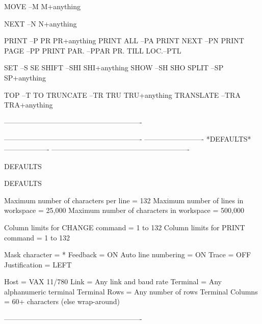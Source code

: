    MOVE         --M            M+anything
 
   NEXT         --N            N+anything
 
   PRINT        --P            PR           PR+anything
   PRINT ALL    --PA
   PRINT NEXT   --PN
   PRINT PAGE   --PP
   PRINT PAR.   --PPAR
   PR. TILL LOC.--PTL
 
   SET          --S            SE
   SHIFT        --SHI          SHI+anything
   SHOW         --SH           SHO
   SPLIT        --SP           SP+anything
 
   TOP          --T            TO
   TRUNCATE     --TR           TRU          TRU+anything
   TRANSLATE    --TRA          TRA+anything
 
----------------------------------------------------------
 
 
 
 
 
 
 
 
 
 
 
 
 
 
 
 
 
 
 
 
 
 
 
 
 
----------------------------------------------------------
-------------------------  *DEFAULTS*  -------------------
----------------------------------------------------------
 
DEFAULTS
 
DEFAULTS
 
   Maximum number of characters   per line   =     132
   Maximum number of lines      in workspace =  25,000
   Maximum number of characters in workspace = 500,000
 
   Column limits for CHANGE command          = 1 to 132
   Column limits for PRINT  command          = 1 to 132
 
   Mask character      = *
   Feedback            = ON
   Auto line numbering = ON
   Trace               = OFF
   Justification       = LEFT
 
   Host                = VAX 11/780
   Link                = Any link and baud rate
   Terminal            = Any alphanumeric terminal
   Terminal Rows       = Any number of rows
   Terminal Columns    = 60+ characters (else wrap-around)
 
----------------------------------------------------------
 
